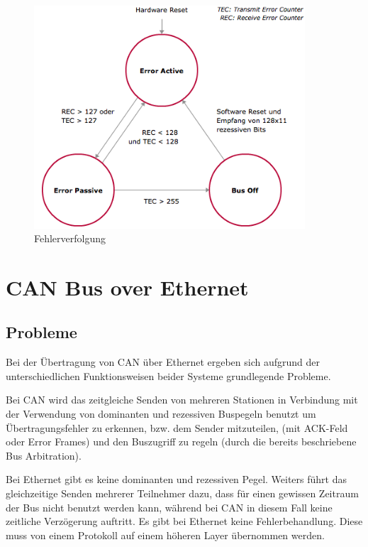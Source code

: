 \begin{figure}[h] 
\centering
\includegraphics[width=0.9\textwidth]{figures/errcount}
\caption{Fehlerverfolgung \citep{VEC}} 
\label{pic:errcount}
\end{figure} 

\clearpage
\section{CAN Bus over Ethernet}
	
\subsection{Probleme}

Bei der Übertragung von CAN über Ethernet ergeben sich aufgrund der unterschiedlichen
Funktionsweisen beider Systeme grundlegende Probleme.

Bei CAN wird das zeitgleiche Senden von mehreren Stationen in Verbindung mit der
Verwendung von dominanten und rezessiven Buspegeln benutzt um Übertragungsfehler zu
erkennen, bzw. dem Sender mitzuteilen, (mit ACK-Feld oder Error Frames) und den
Buszugriff zu regeln (durch die bereits beschriebene Bus Arbitration).

Bei Ethernet gibt es keine dominanten und rezessiven Pegel. Weiters führt das
gleichzeitige Senden mehrerer Teilnehmer dazu, dass für einen gewissen Zeitraum der
Bus nicht benutzt werden kann, während bei CAN in diesem Fall keine zeitliche
Verzögerung auftritt. Es gibt bei Ethernet keine Fehlerbehandlung. Diese muss von
einem Protokoll auf einem höheren Layer übernommen werden.

